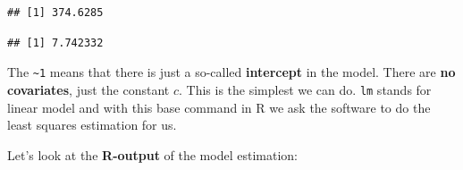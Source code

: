 \documentclass[
]{book}
\newenvironment{Shaded}{\begin{snugshade}}{\end{snugshade}}
\newcommand{\CommentTok}[1]{\textcolor[rgb]{0.56,0.35,0.01}{\textit{#1}}}
\newcommand{\DecValTok}[1]{\textcolor[rgb]{0.00,0.00,0.81}{#1}}
\newcommand{\FunctionTok}[1]{\textcolor[rgb]{0.13,0.29,0.53}{\textbf{#1}}}
\newcommand{\NormalTok}[1]{#1}
\newcommand{\SpecialCharTok}[1]{\textcolor[rgb]{0.81,0.36,0.00}{\textbf{#1}}}
\begin{document}
\begin{verbatim}
## [1] 374.6285
\end{verbatim}

\begin{Shaded}
\end{Shaded}

\begin{verbatim}
## [1] 7.742332
\end{verbatim}

The \texttt{\textasciitilde{}1} means that there is just a so-called \textbf{intercept} in the model.
There are \textbf{no covariates}, just the constant \(c\).
This is the simplest we can do. \texttt{lm} stands for linear model and with this base
command in R we ask the software to do the least squares estimation for us.

Let's look at the \textbf{R-output} of the model estimation:
\end{document}
